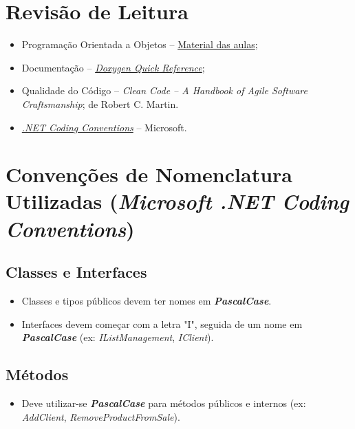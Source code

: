 \documentclass[11pt]{scrartcl} %
\begin{document}
\section{Revisão de Leitura}
\begin{itemize}
	\item Programação Orientada a Objetos – \href{https://github.com/luferIPCA/LESI-POO-2023-2024.git}{Material das aulas};  
	\item Documentação – \href{https://www.mitk.org/images/1/1c/BugSquashingSeminars%242013-07-17-DoxyReference.pdf}{\textit{Doxygen Quick Reference}}; 
	\item Qualidade do Código – \textit{Clean Code – A Handbook of Agile Software Craftsmanship}; de Robert C. Martin.
	\item \href{https://learn.microsoft.com/en-us/dotnet/csharp/fundamentals/coding-style/coding-conventions}{\textit{.NET Coding Conventions}} – Microsoft.
\end{itemize}


\newpage

\section{Convenções de Nomenclatura Utilizadas (\textit{Microsoft .NET Coding Conventions})}

\subsection{Classes e Interfaces}
\begin{itemize}
	\item Classes e tipos públicos devem ter nomes em \textbf{\textit{PascalCase}}.
	\item Interfaces devem começar com a letra "I", seguida de um nome em \textbf{\textit{PascalCase}} (ex: \textit{IListManagement}, \textit{IClient}).
\end{itemize}

\subsection{Métodos}
\begin{itemize}
	\item Deve utilizar-se \textbf{\textit{PascalCase}} para métodos públicos e internos (ex: \textit{AddClient}, \textit{RemoveProductFromSale}).
\end{itemize}
\end{document}
